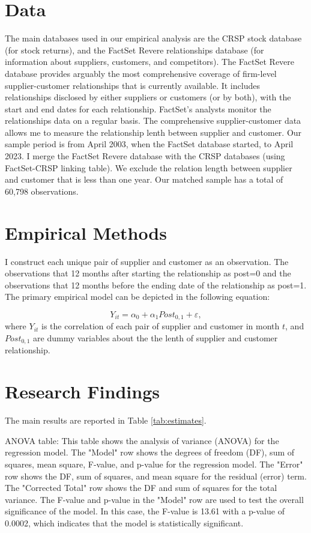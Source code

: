 \documentclass[12pt,english]{article}
\begin{document}
\section{Data}\label{sec:data}
The main databases used in our empirical analysis are the CRSP stock database
(for stock returns), and the FactSet Revere relationships database (for information about
suppliers, customers, and competitors).
The FactSet Revere database provides arguably the most comprehensive
coverage of firm-level supplier-customer relationships that is currently
available. It includes relationships disclosed by either suppliers or customers
(or by both), with the start and end dates for each relationship. FactSet’s analysts
monitor the relationships data on a regular basis. The comprehensive supplier-customer data allows me to measure the relationship lenth between supplier and customer. 
Our sample period is from April 2003, when the FactSet database started, to
April 2023.
I merge the FactSet Revere database with the CRSP databases (using FactSet-CRSP linking table).
We exclude the relation length between supplier and customer that is less than one year. Our matched sample has a total of 60,798 observations.


\section{Empirical Methods}\label{sec:methods}
I construct each unique pair of supplier and customer as an observation. The observations that 12 months after starting the relationship as post=0 and the observations that 12 months before the ending date of the relationship as post=1. 
The primary empirical model can be depicted in the following equation:

\begin{equation}
\label{eq:1}
Y_{it}=\alpha_{0} + \alpha_{1}Post_{0,1} + \varepsilon,
\end{equation}
where $Y_{it}$ is the correlation of each pair of supplier and customer in month $t$, and $Post_{0,1}$ are dummy variables about the the lenth of supplier and customer relationship.


\section{Research Findings}\label{sec:results}
The main results are reported in Table \ref{tab:estimates}.

ANOVA table: This table shows the analysis of variance (ANOVA) for the regression model. The "Model" row shows the degrees of freedom (DF), sum of squares, mean square, F-value, and p-value for the regression model. The "Error" row shows the DF, sum of squares, and mean square for the residual (error) term. The "Corrected Total" row shows the DF and sum of squares for the total variance. The F-value and p-value in the "Model" row are used to test the overall significance of the model. In this case, the F-value is 13.61 with a p-value of 0.0002, which indicates that the model is statistically significant.
\end{document}
